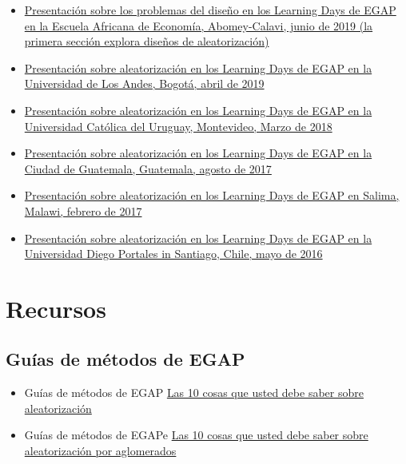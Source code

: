 \documentclass[12pt,spanish,]{book}
\begin{document}
\begin{itemize}
\item
  \href{https://egap.github.io/learningdays-resources/Slides/Examples/threats-benin.pdf}{Presentación sobre los problemas del diseño en los Learning Days de EGAP en la Escuela Africana de Economía, Abomey-Calavi, junio de 2019 (la primera sección explora diseños de aleatorización)}
\item
  \href{https://egap.github.io/learningdays-resources/Slides/Examples/randomization-bogota.pdf}{Presentación sobre aleatorización en los Learning Days de EGAP en la Universidad de Los Andes, Bogotá, abril de 2019}
\item
  \href{https://egap.github.io/learningdays-resources/Slides/Examples/randomization-montevideo.pdf}{Presentación sobre aleatorización en los Learning Days de EGAP en la Universidad Católica del Uruguay, Montevideo, Marzo de 2018}
\item
  \href{https://egap.github.io/learningdays-resources/Slides/Examples/randomization-guatemala.pdf}{Presentación sobre aleatorización en los Learning Days de EGAP en la Ciudad de Guatemala, Guatemala, agosto de 2017}
\item
  \href{https://egap.github.io/learningdays-resources/Slides/Examples/randomization-malawi.pdf}{Presentación sobre aleatorización en los Learning Days de EGAP en Salima, Malawi, febrero de 2017}
\item
  \href{https://egap.github.io/learningdays-resources/Slides/Examples/randomization-santiago.pdf}{Presentación sobre aleatorización en los Learning Days de EGAP en la Universidad Diego Portales in Santiago, Chile, mayo de 2016}
\end{itemize}

\hypertarget{recursos-2}{%
\section{Recursos}\label{recursos-2}}

\hypertarget{guuxedas-de-muxe9todos-de-egap-1}{%
\subsection{Guías de métodos de EGAP}\label{guuxedas-de-muxe9todos-de-egap-1}}

\begin{itemize}
\item
  Guías de métodos de EGAP \href{https://egap.org/resource/10-things-to-know-about-randomization/}{Las 10 cosas que usted debe saber sobre aleatorización}
\item
  Guías de métodos de EGAPe \href{https://egap.org/resource/10-things-to-know-about-cluster-randomization/}{Las 10 cosas que usted debe saber sobre aleatorización por aglomerados}
\end{itemize}
\end{document}
